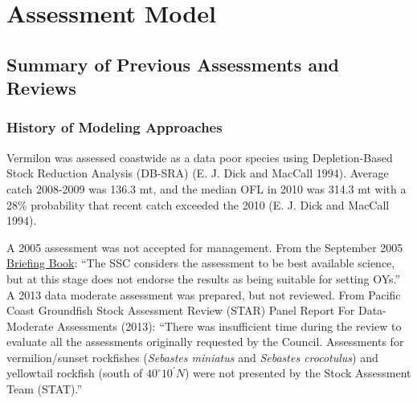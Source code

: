 \documentclass[11pt,
  english,
  a4paper,
]{article}
\begin{document}

\hypertarget{assessment-model}{%
\section{Assessment Model}\label{assessment-model}}

\leavevmode\tagmcend\tagstructend


\hypertarget{summary-of-previous-assessments-and-reviews}{%
\subsection{Summary of Previous Assessments and Reviews}\label{summary-of-previous-assessments-and-reviews}}

\leavevmode\tagmcend\tagstructend


\hypertarget{history-of-modeling-approaches}{%
\subsubsection{History of Modeling Approaches}\label{history-of-modeling-approaches}}

\leavevmode\tagmcend\tagstructend

Vermilon was assessed coastwide as a data poor species using Depletion-Based Stock Reduction Analysis (DB-SRA) {(E. J. Dick and MacCall 1994)\leavevmode\tagmcend\tagstructend}. Average catch 2008-2009 was 136.3 mt, and the median OFL in 2010 was 314.3 mt with a 28\% probability that recent catch exceeded the 2010 {(E. J. Dick and MacCall 1994)\leavevmode\tagmcend\tagstructend}.

A 2005 assessment was not accepted for management. From the September 2005 {\href{https://www.pcouncil.org/documents/2005/09/f-groundfish-management-september-2005.pdf/}{Briefing Book}\leavevmode\tagmcend\tagstructend}: ``The SSC considers the assessment to be best available science, but at this stage does not endorse the results as being suitable for setting OYs.'' A 2013 data moderate assessment was prepared, but not reviewed. From Pacific Coast Groundfish Stock Assessment Review (STAR) Panel Report For Data-Moderate Assessments (2013): ``There was insufficient time during the review to evaluate all the assessments originally requested by the Council. Assessments for vermilion/sunset rockfishes (\emph{Sebastes miniatus} and \emph{Sebastes crocotulus}) and yellowtail rockfish (south of $40^\circ 10^\prime N$) were not presented by the Stock Assessment Team (STAT).''
\end{document}
